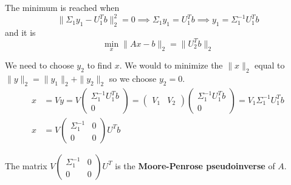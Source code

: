 \documentclass[a4paper, 12pt]{article}
\begin{document}
The minimum is reached when 
$$\| \Sigma_1 y_1 - U_1^T b \|_2^2 = 0 \implies \Sigma_1 y_1 = U_1^T b \implies y_1 = \Sigma_1^{-1} U_1^T b$$
and it is
\[
\min_x \| Ax - b \|_2 = \| U_2^T b \|_2
\]

We need to choose $y_2$ to find $x$. We would to minimize the $\| x \|_2$ equal to $\| y \|_2 = \| y_1 \|_2 + \| y_2 \|_2$ so
we choose $y_2 = 0$.
$$
\begin{aligned}
    x &= Vy = V\begin{pmatrix} \Sigma_1^{-1} U_1^T b \\ 0 \end{pmatrix} = \begin{pmatrix} V_1 & V_2 \end{pmatrix} \begin{pmatrix} \Sigma_1^{-1} U_1^T b \\ 0 \end{pmatrix} = V_1 \Sigma_1^{-1} U_1^T b \\
    x &= V \begin{pmatrix} \Sigma_1^{-1} & 0 \\ 0 & 0 \end{pmatrix} U^T b
\end{aligned}
$$

The matrix $V \begin{pmatrix} \Sigma_1^{-1} & 0 \\ 0 & 0 \end{pmatrix} U^T$ is the \textbf{Moore-Penrose pseudoinverse} of $A$.
\end{document}
